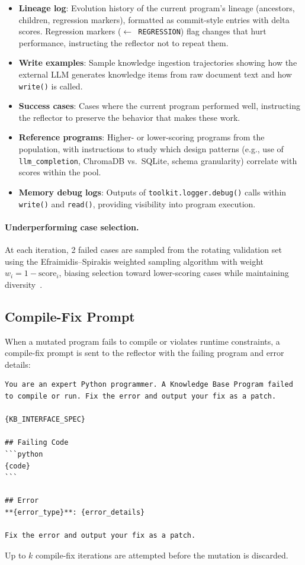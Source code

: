 \begin{itemize}
\item \textbf{Lineage log}: Evolution history of the current program's lineage (ancestors, children, regression markers), formatted as commit-style entries with delta scores.
Regression markers (\texttt{$\leftarrow$ REGRESSION}) flag changes that hurt performance, instructing the reflector not to repeat them.

\item \textbf{Write examples}: Sample knowledge ingestion trajectories showing how the external LLM generates knowledge items from raw document text and how \texttt{write()} is called.

\item \textbf{Success cases}: Cases where the current program performed well, instructing the reflector to preserve the behavior that makes these work.

\item \textbf{Reference programs}: Higher- or lower-scoring programs from the population, with instructions to study which design patterns (e.g., use of \texttt{llm\_completion}, ChromaDB vs.\ SQLite, schema granularity) correlate with scores within the pool.

\item \textbf{Memory debug logs}: Outputs of \texttt{toolkit.logger.debug()} calls within \texttt{write()} and \texttt{read()}, providing visibility into program execution.
\end{itemize}

\paragraph{Underperforming case selection.}
At each iteration, 2 failed cases are sampled from the rotating validation set using the Efraimidis--Spirakis weighted sampling algorithm with weight $w_i = 1 - \text{score}_i$, biasing selection toward lower-scoring cases while maintaining diversity~\citep{efraimidis2006weighted}.

\subsection{Compile-Fix Prompt}
\label{app:compile-fix-prompt}

When a mutated program fails to compile or violates runtime constraints, a compile-fix prompt is sent to the reflector with the failing program and error details:
\begin{lstlisting}[style=evolvedcode, basicstyle=\ttfamily\scriptsize]
You are an expert Python programmer. A Knowledge Base Program failed
to compile or run. Fix the error and output your fix as a patch.

{KB_INTERFACE_SPEC}

## Failing Code
```python
{code}
```

## Error
**{error_type}**: {error_details}

Fix the error and output your fix as a patch.
\end{lstlisting}
Up to $k$ compile-fix iterations are attempted before the mutation is discarded.


